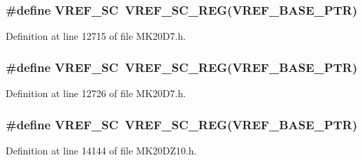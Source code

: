\subsubsection[{\texorpdfstring{V\+R\+E\+F\+\_\+\+SC}{VREF_SC}}]{\setlength{\rightskip}{0pt plus 5cm}\#define V\+R\+E\+F\+\_\+\+SC~{\bf V\+R\+E\+F\+\_\+\+S\+C\+\_\+\+R\+EG}({\bf V\+R\+E\+F\+\_\+\+B\+A\+S\+E\+\_\+\+P\+TR})}\hypertarget{group___v_r_e_f___register___accessor___macros_ga58353078d385155f1c55fad5802549bb}{}\label{group___v_r_e_f___register___accessor___macros_ga58353078d385155f1c55fad5802549bb}


Definition at line 12715 of file M\+K20\+D7.\+h.

\subsubsection[{\texorpdfstring{V\+R\+E\+F\+\_\+\+SC}{VREF_SC}}]{\setlength{\rightskip}{0pt plus 5cm}\#define V\+R\+E\+F\+\_\+\+SC~{\bf V\+R\+E\+F\+\_\+\+S\+C\+\_\+\+R\+EG}({\bf V\+R\+E\+F\+\_\+\+B\+A\+S\+E\+\_\+\+P\+TR})}\hypertarget{group___v_r_e_f___register___accessor___macros_ga58353078d385155f1c55fad5802549bb}{}\label{group___v_r_e_f___register___accessor___macros_ga58353078d385155f1c55fad5802549bb}


Definition at line 12726 of file M\+K20\+D7.\+h.

\subsubsection[{\texorpdfstring{V\+R\+E\+F\+\_\+\+SC}{VREF_SC}}]{\setlength{\rightskip}{0pt plus 5cm}\#define V\+R\+E\+F\+\_\+\+SC~{\bf V\+R\+E\+F\+\_\+\+S\+C\+\_\+\+R\+EG}({\bf V\+R\+E\+F\+\_\+\+B\+A\+S\+E\+\_\+\+P\+TR})}\hypertarget{group___v_r_e_f___register___accessor___macros_ga58353078d385155f1c55fad5802549bb}{}\label{group___v_r_e_f___register___accessor___macros_ga58353078d385155f1c55fad5802549bb}


Definition at line 14144 of file M\+K20\+D\+Z10.\+h.

